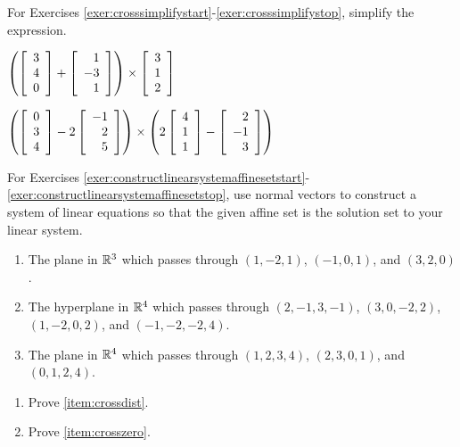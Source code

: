\noindent For Exercises \ref{exer:crosssimplifystart}-\ref{exer:crosssimplifystop}, simplify the expression.
\begin{enumerate}[!HW!, label=$\spadesuit$ \arabic*., ref=\arabic*]
\begin{multicols}{2}
\item\label{exer:crosssimplifystart} $\left(\left[\begin{array}{r} 3\\4\\0 \end{array}\right]+\left[\begin{array}{r} 1\\-3\\1 \end{array}\right]\right) \times \left[\begin{array}{r} 3\\1\\2 \end{array}\right]$ %
\item\label{exer:crosssimplifystop} $\left(\left[\begin{array}{r} 0\\3\\4 \end{array}\right]-2\left[\begin{array}{r} -1\\2\\5 \end{array}\right]\right) \times \left(2\left[\begin{array}{r} 4\\1\\1 \end{array}\right] - \left[\begin{array}{r} 2\\-1\\3 \end{array}\right]\right)$ %
\end{multicols}
\end{enumerate}

\noindent For Exercises \ref{exer:constructlinearsystemaffinesetstart}-\ref{exer:constructlinearsystemaffinesetstop}, use normal vectors to construct a system of linear equations so that the given affine set is the solution set to your linear system. 
\begin{enumerate}[!HW!, label=$\spadesuit$ \arabic*., ref=\arabic*]
\item\label{exer:constructlinearsystemaffinesetstart} The plane in $\mathbb{R}^3$ which passes through $(1,-2,1)$, $(-1,0,1)$, and $(3,2,0)$. %
\item The hyperplane in $\mathbb{R}^4$ which passes through $(2,-1,3,-1)$, $(3,0,-2,2)$, $(1,-2,0,2)$, and $(-1,-2,-2,4)$. %
\item\label{exer:constructlinearsystemaffinesetstop} The plane in $\mathbb{R}^4$ which passes through $(1,2,3,4)$, $(2,3,0,1)$, and $(0,1,2,4)$.  %
\end{enumerate}\vs

\begin{enumerate}[!HW!]
\item Prove  \ref{item:crossdist}.

\item Prove  \ref{item:crosszero}.
\end{enumerate}


 \mbox{}\vfill
 
\pagebreak